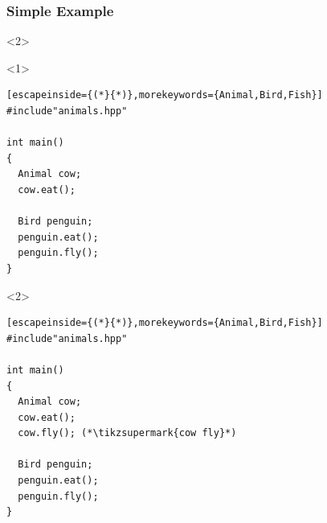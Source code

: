 \documentclass[14pt,a4paper,dvipsnames,usenames]{beamer}
\begin{document}
\begin{frame}[fragile]
  \frametitle{Simple Example}

  \begin{onlyenv}<2>
  \nointerlineskip
  \end{onlyenv}
  
  \begin{overlayarea}{\textwidth}{6cm}
  \begin{onlyenv}<1>
  \begin{lstlisting}[escapeinside={(*}{*)},morekeywords={Animal,Bird,Fish}]
#include"animals.hpp"

int main()
{
  Animal cow;
  cow.eat();

  Bird penguin;
  penguin.eat();
  penguin.fly();
}
  \end{lstlisting}
  \end{onlyenv}

  \begin{onlyenv}<2>

  \begin{lstlisting}[escapeinside={(*}{*)},morekeywords={Animal,Bird,Fish}]
#include"animals.hpp"

int main()
{
  Animal cow;
  cow.eat();
  cow.fly(); (*\tikzsupermark{cow fly}*)

  Bird penguin;
  penguin.eat();
  penguin.fly();
}
  \end{lstlisting}
  \end{onlyenv}
  \end{overlayarea}

\end{frame}
\end{document}
